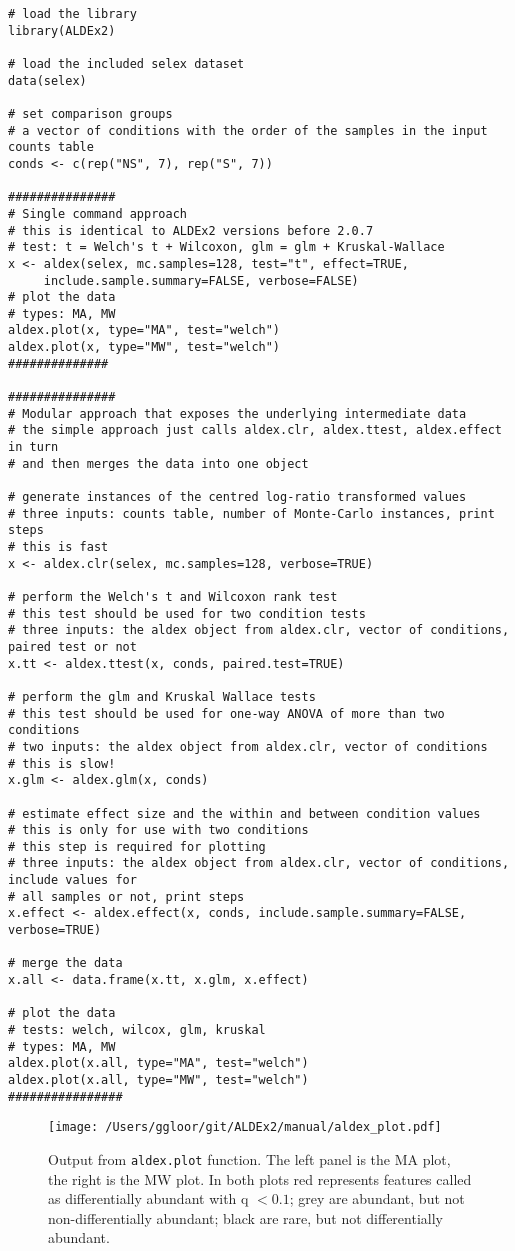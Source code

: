 \documentclass[11pt]{article}
\begin{document}
\begin{verbatim}
# load the library
library(ALDEx2)  

# load the included selex dataset
data(selex)  

# set comparison groups
# a vector of conditions with the order of the samples in the input counts table
conds <- c(rep("NS", 7), rep("S", 7))  

###############
# Single command approach
# this is identical to ALDEx2 versions before 2.0.7
# test: t = Welch's t + Wilcoxon, glm = glm + Kruskal-Wallace
x <- aldex(selex, mc.samples=128, test="t", effect=TRUE, 
     include.sample.summary=FALSE, verbose=FALSE)
# plot the data
# types: MA, MW
aldex.plot(x, type="MA", test="welch")
aldex.plot(x, type="MW", test="welch")
##############

###############
# Modular approach that exposes the underlying intermediate data
# the simple approach just calls aldex.clr, aldex.ttest, aldex.effect in turn
# and then merges the data into one object

# generate instances of the centred log-ratio transformed values
# three inputs: counts table, number of Monte-Carlo instances, print steps
# this is fast
x <- aldex.clr(selex, mc.samples=128, verbose=TRUE)  

# perform the Welch's t and Wilcoxon rank test
# this test should be used for two condition tests
# three inputs: the aldex object from aldex.clr, vector of conditions, paired test or not
x.tt <- aldex.ttest(x, conds, paired.test=TRUE)  

# perform the glm and Kruskal Wallace tests
# this test should be used for one-way ANOVA of more than two conditions 
# two inputs: the aldex object from aldex.clr, vector of conditions
# this is slow!
x.glm <- aldex.glm(x, conds)  

# estimate effect size and the within and between condition values 
# this is only for use with two conditions
# this step is required for plotting
# three inputs: the aldex object from aldex.clr, vector of conditions, include values for 
# all samples or not, print steps
x.effect <- aldex.effect(x, conds, include.sample.summary=FALSE, verbose=TRUE) 

# merge the data
x.all <- data.frame(x.tt, x.glm, x.effect)

# plot the data
# tests: welch, wilcox, glm, kruskal
# types: MA, MW
aldex.plot(x.all, type="MA", test="welch")
aldex.plot(x.all, type="MW", test="welch")
################
\end{verbatim}
\begin{figure}[!h]
\begin{center}
\texttt{[image: /Users/ggloor/git/ALDEx2/manual/aldex\_plot.pdf]}
\caption{Output from \texttt{aldex.plot} function. The left panel is the MA plot, the right is the MW plot. In both plots red represents features called as differentially abundant with q $<0.1$; grey are abundant, but not non-differentially abundant; black are rare, but not differentially abundant.}
\label{selex}\vspace{-0.8cm}
\end{center}
\end{figure}
\end{document}
